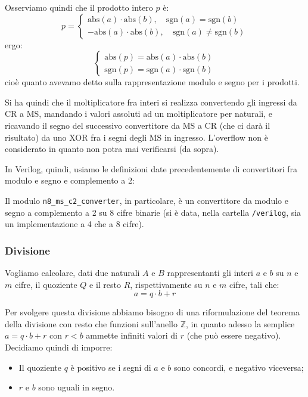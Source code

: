 \documentclass[a4paper,11pt]{article}
\begin{document}
Osserviamo quindi che il prodotto intero $p$ è:
$$
p =
\begin{cases}
	\mathrm{abs}(a) \cdot \mathrm{abs}(b), \quad \mathrm{sgn}(a) = \mathrm{sgn}(b) \\ 
	-\mathrm{abs}(a) \cdot \mathrm{abs}(b), \quad \mathrm{sgn}(a) \neq \mathrm{sgn}(b)
\end{cases}
$$
ergo:
\[
	\begin{cases}
		\mathrm{abs}(p) = \mathrm{abs}(a) \cdot \mathrm{abs}(b) \\ 	
		\mathrm{sgn}(p) = \mathrm{sgn}(a) \cdot \mathrm{sgn}(b)
	\end{cases}
\]
cioè quanto avevamo detto sulla rappresentazione modulo e segno per i prodotti. 

Si ha quindi che il moltiplicatore fra interi si realizza convertendo gli ingressi da CR a MS, mandando i valori assoluti ad un moltiplicatore per naturali, e ricavando il segno del successivo convertitore da MS a CR (che ci darà il risultato) da uno XOR fra i segni degli MS in ingresso.
L'overflow non è considerato in quanto non potra mai verificarsi (da sopra).

In Verilog, quindi, usiamo le definizioni date precedentemente di convertitori fra modulo e segno e complemento a 2:



Il modulo \lstinline|n8_ms_c2_converter|, in particolare, è un convertitore da modulo e segno a complemento a 2 su 8 cifre binarie (si è data, nella cartella \lstinline|/verilog|, sia un implementazione a 4 che a 8 cifre).

\subsubsection{Divisione}
Vogliamo calcolare, dati due naturali $A$ e $B$ rappresentanti gli interi $a$ e $b$ su $n$ e $m$ cifre, il quoziente $Q$ e il resto $R$, rispettivamente su $n$ e $m$ cifre, tali che:
$$
a = q \cdot b + r
$$

Per svolgere questa divisione abbiamo bisogno di una riformulazione del teorema della divisione con resto che funzioni sull'anello $\mathbb{Z}$, in quanto adesso la semplice $a = q \cdot b + r$ con $r < b$ ammette infiniti valori di $r$ (che può essere negativo).
Decidiamo quindi di imporre:
\begin{itemize}
	\item Il quoziente $q$ è positivo se i segni di $a$ e $b$ sono concordi, e negativo viceversa;
	\item $r$ e $b$ sono uguali in segno.
\end{itemize}
\end{document}
